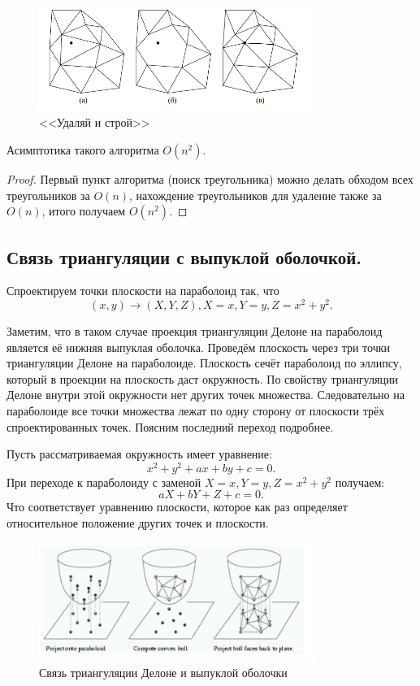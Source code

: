 \begin{figure}[H]    
  \centering    
  \includegraphics[width=0.8\textwidth]{figures/deloneConstruct.png}    
  \caption*{<<Удаляй и строй>>}        
\end{figure} 

\begin{remark}
  Асимптотика такого алгоритма $O(n^2)$.
\end{remark}
\begin{proof}
  Первый пункт алгоритма (поиск треугольника) можно делать обходом всех треугольников за $O(n)$, нахождение
  треугольников для удаление также за $O(n)$, итого получаем  $O(n^2)$.
\end{proof}

\subsection{Связь триангуляции с выпуклой оболочкой.}
Спроектируем точки плоскости на параболоид так, что
\[
  (x, y) \to (X, Y, Z), X = x, Y = y, Z = x^2 + y^2
.\] 

Заметим, что в таком случае проекция триангуляции Делоне на параболоид является её нижняя выпуклая оболочка.
Проведём плоскость через три точки триангуляции Делоне на параболоиде. Плоскость сечёт параболоид
по эллипсу, который в проекции на плоскость даст окружность. По свойству триангуляции Делоне внутри
этой окружности нет других точек множества. Следовательно на параболоиде все точки множества лежат
по одну сторону от плоскости трёх спроектированных точек. Поясним последний переход подробнее.

Пусть рассматриваемая окружность имеет уравнение:
\[
  x^2 + y^2 + ax + by + c = 0
.\] 
При переходе к параболоиду с заменой $X = x, Y = y, Z = x^2 + y^2$ получаем:
\[
  aX + bY + Z + c = 0
.\] 
Что соответствует уравнению плоскости, которое как раз определяет относительное положение других точек и
плоскости.
\begin{figure}[H]    
  \centering    
  \includegraphics[width=0.8\textwidth]{figures/deloneConvex.png}    
  \caption*{Связь триангуляции Делоне и выпуклой оболочки}        
\end{figure} 

